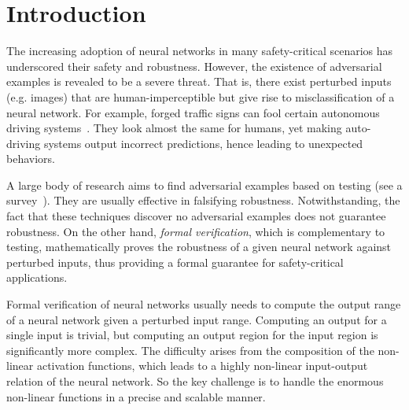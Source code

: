 \documentclass[runningheads]{llncs}
\begin{document}
\section{Introduction}

The increasing adoption of neural networks in many safety-critical
scenarios has underscored their safety and robustness.  However, the
existence of adversarial examples is revealed to be a severe threat.
That is, there exist perturbed inputs (e.g. images) that are
human-imperceptible but give rise to misclassification of a neural
network.  For example, forged traffic signs can fool certain
autonomous driving systems~\cite{DBLP:journals/corr/abs-1907-00374}.
They look almost the same for humans, yet making auto-driving systems
output incorrect predictions, hence leading to unexpected behaviors.


A large body of research aims to find adversarial examples based on testing
(see a survey~\cite{ZhangHML22}).
They are usually effective in falsifying robustness.
Notwithstanding, the fact that these techniques discover no adversarial examples
does not guarantee robustness.
On the other hand, \emph{formal verification},
which is complementary to testing, mathematically proves the robustness of a given
neural network against perturbed inputs,
thus providing a formal guarantee for safety-critical applications.


Formal verification of neural networks usually needs to compute the output range
of a neural network given a perturbed input range.
Computing an output for a single input is trivial,
but computing an output region for the input region is significantly more complex.
The difficulty arises from the composition of the non-linear activation functions,
which leads to a highly non-linear input-output relation of the neural network.
So the key challenge is to handle the enormous non-linear functions in a precise
and scalable manner.
\end{document}
